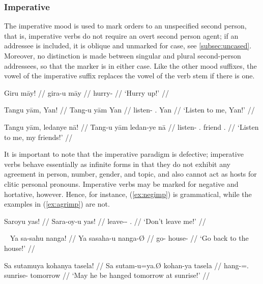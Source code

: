 
\subsubsection{Imperative}

The imperative mood is used to mark orders to an unspecified second person, 
that is, imperative verbs do not require an overt second person agent; if an 
addressee is included, it is oblique and unmarked for case, see 
\autoref{subsec:uncased}. Moreover, no distinction is made between singular and 
plural second-person addressees, so that the marker is  in either 
case. Like the other mood suffixes, the vowel of the imperative suffix replaces 
the vowel of the verb stem if there is one.

\pex
\a\begingl
	\gla Giru māy! //
	\glb gira-u māy //
	\glc hurry-\Imp{} \Int{} //
	\glft `Hurry up!' //
\endgl

\a\begingl
	\gla Tangu yām, Yan! //
	\glb Tang-u yām Yan //
	\glc listen-\Imp{} \Fsg{}.\Dat{} Yan //
	\glft `Listen to me, Yan!' //
\endgl

\a\begingl
	\gla Tangu yām, ledanye nā! //
	\glb Tang-u yām ledan-ye nā //
	\glc listen-\Imp{} \Fsg{}.\Dat{} friend \Fsg{}.\Gen{} //
	\glft `Listen to me, my friends!' //
\endgl

\xe

It is important to note that the imperative paradigm is defective; imperative 
verbs behave essentially as infinite forms in that they do not exhibit any 
agreement in person, number, gender, and topic, and also cannot act as hosts 
for clitic personal pronouns. Imperative verbs may be marked for negative and 
hortative, however. Hence, for instance, (\ref{ex:negimp}) is grammatical, 
while the examples in (\ref{ex:agrimp}) are not.

\ex\label{ex:negimp}\begingl
	\gla Saroyu yas! //
	\glb Sara-oy-u yas! //
	\glc leave-\Neg{}-\Imp{} \Fsg{}.\Parg{} //
	\glft `Don't leave me!' //
\endgl\xe

\pex~\label{ex:agrimp}
\a\label{ex:topimp}\ljudge*\begingl
	\gla Ya sa-sahu nanga! //
	\glb Ya sa\til{}saha-u nanga-Ø //
	\glc \LocT{} \Iter{}\til{}go-\Imp{} house-\Top{} //
	\glft `Go back to the house!' //
\endgl

\a\label{ex:persimp}\ljudge*\begingl
	\gla Sa sutamuya kohanya tasela! //
	\glb Sa sutam-u=ya.Ø kohan-ya tasela //
	\glc \PatT{} hang-\Imp{}=\TsgM{}.\Top{} sunrise-\Loc{} tomorrow //
	\glft `May he be hanged tomorrow at sunrise!' //
\endgl
\xe

